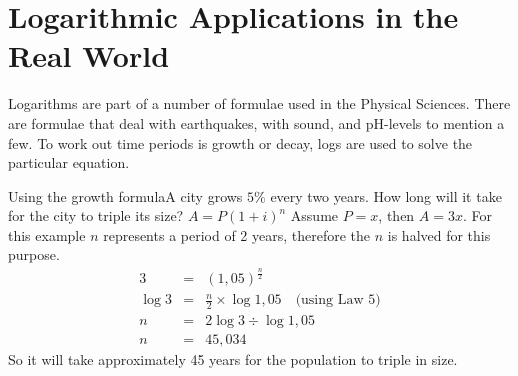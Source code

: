 

\section{Logarithmic Applications in the Real World}

Logarithms are part of a number of formulae used in the Physical Sciences.  There are formulae that deal with earthquakes, with sound, and pH-levels to mention a few.  To work out time periods is growth or decay, logs are used to solve the particular equation.

\begin{wex}{Using the growth formula}{A city grows $5\%$ every two years. How long will it take for the city to triple its size?}{
$A = P(1 + i)^n$
Assume $P = x$, then $A = 3x$.
For this example $n$ represents a period of 2 years, therefore the $n$ is halved for this purpose.
\begin{eqnarray*}
3 &=& (1,05)^{\frac{n}{2}}\\
\log{3} &=& \frac{n}{2} \times {\log{1,05}}\quad \mbox{(using Law 5)}\\
n &=& 2 \log{3} \div {\log{1,05}}\\
n &=& 45,034
\end{eqnarray*}
So it will take approximately 45 years for the population to triple in size.
}
\end{wex}

